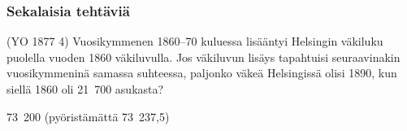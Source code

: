 \subsubsection*{Sekalaisia tehtäviä}

\begin{tehtava}
(YO 1877 4) Vuosikymmenen 1860--70 kuluessa lisääntyi Helsingin väkiluku puolella vuoden 1860 väkiluvulla. Jos väkiluvun lisäys tapahtuisi seuraavinakin vuosikymmeninä samassa suhteessa, paljonko väkeä Helsingissä olisi 1890, kun siellä 1860 oli 21~700 asukasta? 
	\begin{vastaus}
	73~200 (pyöristämättä 73~237,5)
	\end{vastaus}
\end{tehtava}


